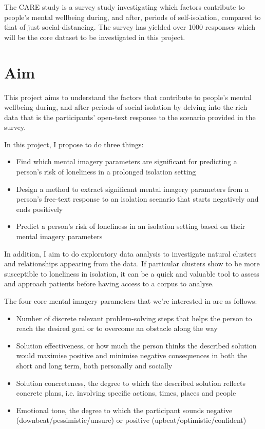 \documentclass[12pt, a4paper]{article}
\begin{document}
The CARE study is a survey study investigating which factors contribute to people's mental wellbeing during, and after, periods of self-isolation, compared to that of just social-distancing. The survey has yielded over 1000 responses which will be the core dataset to be investigated in this project.

\section*{Aim} This project aims to understand the factors that contribute to people's mental wellbeing during, and after periods of social isolation by delving into the rich data that is the participants' open-text response to the scenario provided in the survey.

In this project, I propose to do three things: 
\begin{itemize}
	\item Find which mental imagery parameters are significant for predicting a person's risk of loneliness in a prolonged isolation setting  
	\item Design a method to extract significant mental imagery parameters from a person's free-text response to an isolation scenario that starts negatively and ends positively
	\item Predict a person's risk of loneliness in an isolation setting based on their mental imagery parameters
\end{itemize}

In addition, I aim to do exploratory data analysis to investigate natural clusters and relationships appearing from the data. If particular clusters show to be more susceptible to loneliness in isolation, it can be a quick and valuable tool to assess and approach patients before having access to a corpus to analyse.

The four core mental imagery parameters that we're interested in are as follows:
\begin{itemize}
	\item Number of discrete relevant problem-solving steps that helps the person to reach the desired goal or to overcome an obstacle along the way
	\item Solution effectiveness, or how much the person thinks the described solution would maximise positive and minimise negative consequences in both the short and long term, both personally and socially
	\item Solution concreteness, the degree to which the described solution reflects concrete plans, i.e. involving specific actions, times, places and people
	\item Emotional tone, the degree to which the participant sounds negative (downbeat/pessimistic/unsure) or positive (upbeat/optimistic/confident)
\end{itemize}
\end{document}
